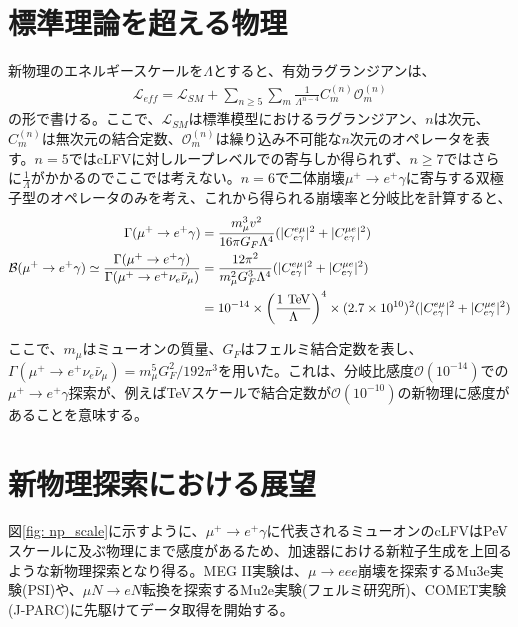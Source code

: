 \documentclass[Yonemoto_master.tex]{subfiles}
\begin{document}
\section{標準理論を超える物理}

新物理のエネルギースケールを$\Lambda$とすると、有効ラグランジアンは、
\begin{align}
\mathcal{L}_{eff} = \mathcal{L}_{SM} + \sum_{n \geq 5} \sum_{m} \frac{1}{\Lambda^{n-4}} C^{(n)}_m \mathcal{O}^{(n)}_m
\end{align}
\noindent の形で書ける\cite{lag_eff}。ここで、$\mathcal{L}_{SM}$は標準模型におけるラグランジアン、$n$は次元、$C^{(n)}_m$は無次元の結合定数、$\mathcal{O}^{(n)}_m$は繰り込み不可能な$n$次元のオペレータを表す。$n=5$ではcLFVに対しループレベルでの寄与しか得られず、$n \geq 7$ではさらに$\frac{1}{\Lambda}$がかかるのでここでは考えない。$n=6$で二体崩壊$\mu^+ \to e^+ \gamma$に寄与する双極子型のオペレータのみを考え、これから得られる崩壊率と分岐比を計算すると、
\begin{align}
\Gamma(\mu^+ \to e^+ \gamma) &= \frac{m^3_\mu v^2}{16\pi G_F \Lambda^4} (|C^{e\mu}_{e\gamma}|^2 + |C^{\mu e}_{e \gamma}|^2) \\
\mathcal{B}(\mu^+ \to e^+ \gamma) \simeq \frac{\Gamma(\mu^+ \to e^+ \gamma)}{\Gamma(\mu^+ \to e^+\nu_e\bar{\nu}_{\mu})} &= \frac{12 \pi^2}{m^2_{\mu} G^3_F \Lambda^4}(|C^{e\mu}_{e\gamma}|^2 + |C^{\mu e}_{e \gamma}|^2) \nonumber \\
&= 10^{-14} \times \left(\frac{1 \ {\rm TeV}}{\Lambda}\right)^4 \times (2.7 \times 10^{10})^2(|C^{e\mu}_{e\gamma}|^2 + |C^{\mu e}_{e \gamma}|^2 )
\end{align}

\noindent ここで、$m_\mu$はミューオンの質量、$G_F$はフェルミ結合定数を表し、$\Gamma(\mu^+ \to e^+\nu_e\bar{\nu}_{\mu}) = m^5_{\mu} G^2_F / 192 \pi^3$を用いた。これは、分岐比感度$\mathcal{O}(10^{-14})$での$\mu^+ \to e^+ \gamma$探索が、例えばTeVスケールで結合定数が$\mathcal{O}(10^{-10})$の新物理に感度があることを意味する。

\section{新物理探索における展望}
図\ref{fig: np_scale}に示すように、$\mu^+ \to e^+ \gamma$に代表されるミューオンのcLFVはPeVスケールに及ぶ物理にまで感度があるため、加速器における新粒子生成を上回るような新物理探索となり得る。MEG II実験は、$\mu \to eee$崩壊を探索するMu3e実験(PSI)や、$\mu N \to eN$転換を探索するMu2e実験(フェルミ研究所)、COMET実験(J-PARC)に先駆けてデータ取得を開始する。
\end{document}
